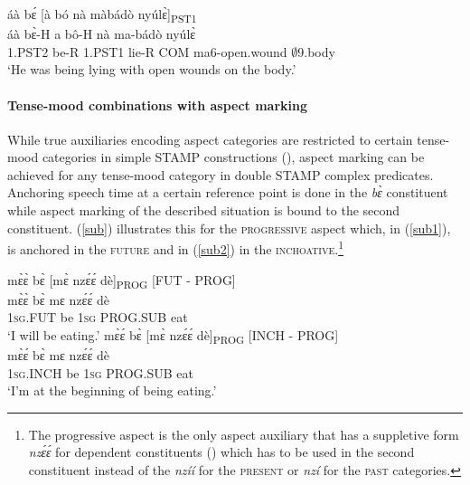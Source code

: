 \begin{exe} 
\ex\label{embed4}
  \glll áà bɛ́ [à bó nà màbádò nyúlɛ̀]\textsubscript{PST1} \\
        áà bɛ̀-H a bô-H nà ma-bádò nyúlɛ̀ \\
        1.PST2 be-R 1.PST1 lie-R COM ma6-open.wound $\emptyset$9.body  \\
    \trans `He was being lying with open wounds on the body.'
\end{exe}



\paragraph{Tense-mood combinations with aspect marking}

While true auxiliaries encoding aspect categories are restricted to certain tense-mood categories in simple STAMP constructions (), aspect marking can be achieved for any tense-mood category in double STAMP complex predicates. Anchoring speech time at a certain reference point is done in the {\itshape bɛ̀} constituent while aspect marking of the described situation is bound to the second constituent.
(\ref{sub}) illustrates this for the \textsc{progressive} aspect which, in (\ref{sub1}), is anchored in the \textsc{future} and in (\ref{sub2}) in the \textsc{inchoative}.\footnote{The progressive aspect is the only aspect auxiliary that has a suppletive form {\itshape nzɛ́ɛ́} for dependent constituents () which has to be used in the second constituent instead of the {\itshape nzíí} for the \textsc{present} or {\itshape nzí} for the \textsc{past} categories.}

\begin{exe} 
\ex\label{sub}
\begin{xlist}
\ex\label{sub1}
  \glll    mɛ̀ɛ̀ bɛ̀ [mɛ̀ nzɛ́ɛ́ dè]\textsubscript{PROG} \hfill [FUT - PROG]  \\
            mɛ̀ɛ̀ bɛ̀ mɛ nzɛ́ɛ́ dè \\
             1\textsc{sg}.FUT be 1\textsc{sg} PROG.SUB eat    \\
    \trans `I will be eating.'
\ex\label{sub2}
  \glll   mɛ̀ɛ́ bɛ̀ [mɛ̀ nzɛ́ɛ́ dè]\textsubscript{PROG} \hfill [INCH - PROG] \\
          mɛ̀ɛ́ bɛ̀ mɛ nzɛ́ɛ́ dè \\
              1\textsc{sg}.INCH be 1\textsc{sg} PROG.SUB eat   \\
    \trans `I'm at the beginning of being eating.'
\end{xlist}
\end{exe}

